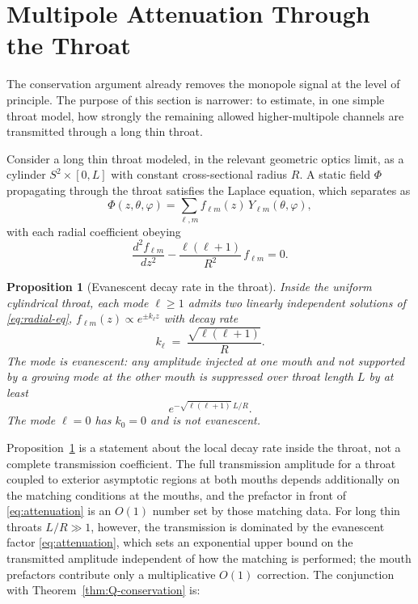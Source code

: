 \documentclass[aps,prd,onecolumn,nofootinbib,superscriptaddress]{revtex4-2}
\newtheorem{proposition}{Proposition}
\begin{document}
\section{Multipole Attenuation Through the Throat}
\label{sec:attenuation}

The conservation argument already removes the monopole signal at the level of principle. The purpose of this section is narrower: to estimate, in one simple throat model, how strongly the remaining allowed higher-multipole channels are transmitted through a long thin throat.

Consider a long thin throat modeled, in the relevant geometric optics limit, as a cylinder $S^2 \times [0,L]$ with constant cross-sectional radius $R$. A static field $\Phi$ propagating through the throat satisfies the Laplace equation, which separates as
\begin{equation}
\Phi(z,\theta,\varphi) = \sum_{\ell,m} f_{\ell m}(z)\, Y_{\ell m}(\theta,\varphi),
\end{equation}
with each radial coefficient obeying
\begin{equation}
\label{eq:radial-eq}
\frac{d^2 f_{\ell m}}{dz^2} - \frac{\ell(\ell+1)}{R^2}\, f_{\ell m} = 0.
\end{equation}

\begin{proposition}[Evanescent decay rate in the throat]
\label{prop:attenuation}
Inside the uniform cylindrical throat, each mode $\ell \ge 1$ admits two linearly independent solutions of \eqref{eq:radial-eq}, $f_{\ell m}(z) \propto e^{\pm k_\ell z}$ with decay rate
\begin{equation}
\label{eq:decay-rate}
k_\ell \;=\; \frac{\sqrt{\ell(\ell+1)}}{R}.
\end{equation}
The mode is evanescent: any amplitude injected at one mouth and not supported by a growing mode at the other mouth is suppressed over throat length $L$ by at least
\begin{equation}
\label{eq:attenuation}
e^{-\sqrt{\ell(\ell+1)}\,L/R}.
\end{equation}
The mode $\ell=0$ has $k_0 = 0$ and is not evanescent.
\end{proposition}

Proposition~\ref{prop:attenuation} is a statement about the local decay rate inside the throat, not a complete transmission coefficient. The full transmission amplitude for a throat coupled to exterior asymptotic regions at both mouths depends additionally on the matching conditions at the mouths, and the prefactor in front of \eqref{eq:attenuation} is an $O(1)$ number set by those matching data. For long thin throats $L/R \gg 1$, however, the transmission is dominated by the evanescent factor \eqref{eq:attenuation}, which sets an exponential upper bound on the transmitted amplitude independent of how the matching is performed; the mouth prefactors contribute only a multiplicative $O(1)$ correction. The conjunction with Theorem~\ref{thm:Q-conservation} is:
\end{document}
